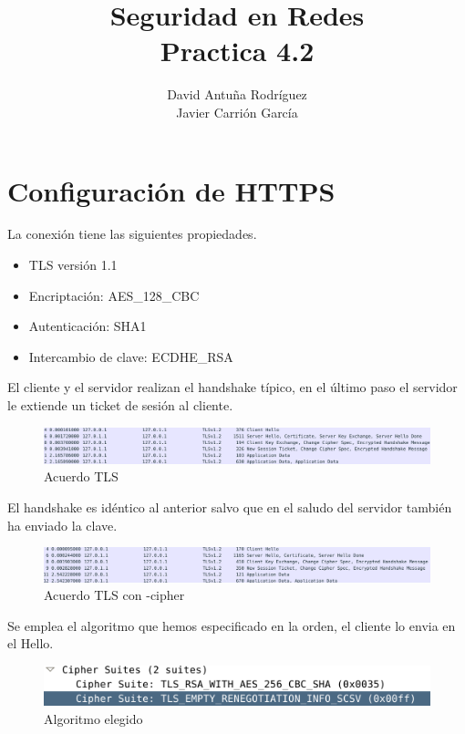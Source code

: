 \documentclass[11pt]{article}
\title{\Large Seguridad en Redes\\Practica 4.2}
\author{David Antuña Rodríguez\\Javier Carrión García}
\date{}
\begin{document}
  \raggedright

  \maketitle
  \newpage

  \section{Configuración de HTTPS}
    \par
    La conexión tiene las siguientes propiedades.
    \begin{itemize}
      \item TLS versión 1.1
      \item Encriptación: AES\_128\_CBC
      \item Autenticación: SHA1
      \item Intercambio de clave: ECDHE\_RSA
    \end{itemize}

    \par
    El cliente y el servidor realizan el handshake típico, en el último paso
    el servidor le extiende un ticket de sesión al cliente.

    \begin{figure}[H]
      \centering
      \includegraphics[width = \textwidth]{tls1}
      \caption{Acuerdo TLS}
    \end{figure}


    \par
    El handshake es idéntico al anterior salvo que en el saludo del servidor
    también ha enviado la clave.

    \begin{figure}[H]
      \centering
      \includegraphics[width = \textwidth]{tls2}
      \caption{Acuerdo TLS con -cipher}
    \end{figure}
    
    \par
    Se emplea el algoritmo que hemos especificado en la orden, el cliente lo envia en el Hello.
    
    \begin{figure}[H]
      \centering
      \includegraphics[width = \textwidth]{alg}
      \caption{Algoritmo elegido}
    \end{figure}
\end{document}
